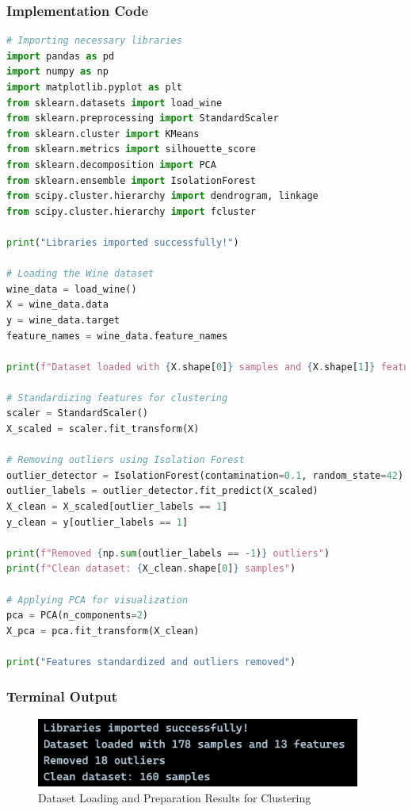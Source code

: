 \documentclass[12pt,a4paper]{article}
\begin{document}
\subsubsection{Implementation Code}
\begin{lstlisting}[language=Python, caption=Dataset Loading and Clustering Preparation]
# Importing necessary libraries
import pandas as pd
import numpy as np
import matplotlib.pyplot as plt
from sklearn.datasets import load_wine
from sklearn.preprocessing import StandardScaler
from sklearn.cluster import KMeans
from sklearn.metrics import silhouette_score
from sklearn.decomposition import PCA
from sklearn.ensemble import IsolationForest
from scipy.cluster.hierarchy import dendrogram, linkage
from scipy.cluster.hierarchy import fcluster

print("Libraries imported successfully!")

# Loading the Wine dataset
wine_data = load_wine()
X = wine_data.data
y = wine_data.target
feature_names = wine_data.feature_names

print(f"Dataset loaded with {X.shape[0]} samples and {X.shape[1]} features")

# Standardizing features for clustering
scaler = StandardScaler()
X_scaled = scaler.fit_transform(X)

# Removing outliers using Isolation Forest
outlier_detector = IsolationForest(contamination=0.1, random_state=42)
outlier_labels = outlier_detector.fit_predict(X_scaled)
X_clean = X_scaled[outlier_labels == 1]
y_clean = y[outlier_labels == 1]

print(f"Removed {np.sum(outlier_labels == -1)} outliers")
print(f"Clean dataset: {X_clean.shape[0]} samples")

# Applying PCA for visualization
pca = PCA(n_components=2)
X_pca = pca.fit_transform(X_clean)

print("Features standardized and outliers removed")
\end{lstlisting}

\subsubsection{Terminal Output}
\begin{figure}[h!]
\centering
    \includegraphics[width=0.95\textwidth]{Figures/clustering_loading.png}
    \caption{Dataset Loading and Preparation Results for Clustering}
\end{figure}
\end{document}
